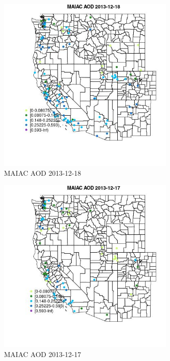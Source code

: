 \begin{figure} 
\centering  
\includegraphics[width=0.77\textwidth]{Code_Outputs/Report_ML_input_PM25_Step4_part_e_de_duplicated_aves_MapObsMAIAC_AOD2013-12-18.jpg} 
\caption{\label{fig:Report_ML_input_PM25_Step4_part_e_de_duplicated_avesMapObsMAIAC_AOD2013-12-18}MAIAC AOD 2013-12-18} 
\end{figure} 
 

\begin{figure} 
\centering  
\includegraphics[width=0.77\textwidth]{Code_Outputs/Report_ML_input_PM25_Step4_part_e_de_duplicated_aves_MapObsMAIAC_AOD2013-12-17.jpg} 
\caption{\label{fig:Report_ML_input_PM25_Step4_part_e_de_duplicated_avesMapObsMAIAC_AOD2013-12-17}MAIAC AOD 2013-12-17} 
\end{figure} 
 

